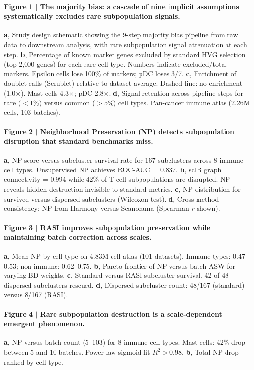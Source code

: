 \documentclass[10pt]{article}
\begin{document}
\paragraph{Figure 1 $|$ The majority bias: a cascade of nine implicit assumptions systematically excludes rare subpopulation signals.}
\textbf{a}, Study design schematic showing the 9-step majority bias pipeline from raw data to downstream analysis, with rare subpopulation signal attenuation at each step.
\textbf{b}, Percentage of known marker genes excluded by standard HVG selection (top 2,000 genes) for each rare cell type. Numbers indicate excluded/total markers. Epsilon cells lose 100\% of markers; pDC loses 3/7.
\textbf{c}, Enrichment of doublet calls (Scrublet) relative to dataset average. Dashed line: no enrichment (1.0$\times$). Mast cells 4.3$\times$; pDC 2.8$\times$.
\textbf{d}, Signal retention across pipeline steps for rare ($<$1\%) versus common ($>$5\%) cell types. Pan-cancer immune atlas (2.26M cells, 103 batches).

\paragraph{Figure 2 $|$ Neighborhood Preservation (NP) detects subpopulation disruption that standard benchmarks miss.}
\textbf{a}, NP score versus subcluster survival rate for 167 subclusters across 8 immune cell types. Unsupervised NP achieves ROC-AUC = 0.837.
\textbf{b}, scIB graph connectivity = 0.994 while 42\% of T cell subpopulations are disrupted. NP reveals hidden destruction invisible to standard metrics.
\textbf{c}, NP distribution for survived versus dispersed subclusters (Wilcoxon test).
\textbf{d}, Cross-method consistency: NP from Harmony versus Scanorama (Spearman $r$ shown).

\paragraph{Figure 3 $|$ RASI improves subpopulation preservation while maintaining batch correction across scales.}
\textbf{a}, Mean NP by cell type on 4.83M-cell atlas (101 datasets). Immune types: 0.47--0.53; non-immune: 0.62--0.75.
\textbf{b}, Pareto frontier of NP versus batch ASW for varying BD weights.
\textbf{c}, Standard versus RASI subcluster survival. 42 of 48 dispersed subclusters rescued.
\textbf{d}, Dispersed subcluster count: 48/167 (standard) versus 8/167 (RASI).

\paragraph{Figure 4 $|$ Rare subpopulation destruction is a scale-dependent emergent phenomenon.}
\textbf{a}, NP versus batch count (5--103) for 8 immune cell types. Mast cells: 42\% drop between 5 and 10 batches. Power-law sigmoid fit $R^2 > 0.98$.
\textbf{b}, Total NP drop ranked by cell type.
\end{document}
